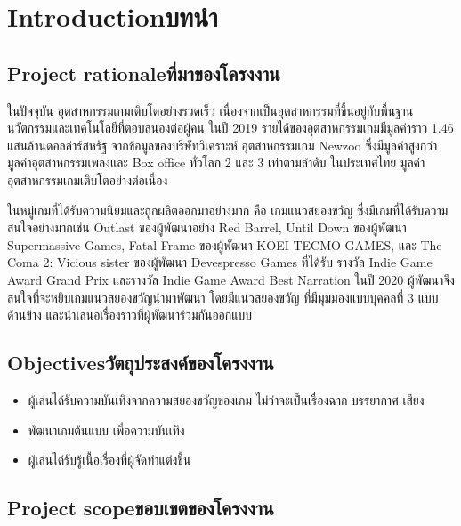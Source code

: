\chapter{\ifenglish Introduction\else บทนำ\fi}

\section{\ifenglish Project rationale\else ที่มาของโครงงาน\fi}


ในปัจจุบัน อุตสาหกรรมเกมเติบโตอย่างรวดเร็ว เนื่องจากเป็นอุตสาหกรรมที่ขึ้นอยู่กับพื้นฐานนวัตกรรมและเทคโนโลยีที่ตอบสนองต่อผู้คน ในปี 2019 รายได้ของอุตสาหกรรมเกมมีมูลค่าราว 1.46 แสนล้านดอลล่าร์สหรัฐ จากข้อมูลของบริษัทวิเคราะห์
อุตสาหกรรมเกม Newzoo ซึ่งมีมูลค่าสูงกว่ามูลค่าอุตสาหกรรมเพลงและ Box office ทั่วโลก 2 และ 3 เท่าตามลำดับ ในประเทศไทย มูลค่าอุตสาหกรรมเกมเติบโตอย่างต่อเนื่อง 


ในหมู่เกมที่ได้รับความนิยมและถูกผลิตออกมาอย่างมาก คือ เกมแนวสยองขวัญ ซึ่งมีเกมที่ได้รับความสนใจอย่างมากเช่น Outlast ของผู้พัฒนาอย่าง Red Barrel, Until Down ของผู้พัฒนา Supermassive Games, 
Fatal Frame ของผู้พัฒนา KOEI TECMO GAMES, และ The Coma 2: Vicious sister ของผู้พัฒนา Devespresso Games ที่ได้รับ รางวัล Indie Game Award Grand Prix และรางวัล Indie Game Award Best Narration 
ในปี 2020 ผู้พัฒนาจึงสนใจที่จะหยิบเกมแนวสยองขวัญนำมาพัฒนา โดยมีแนวสยองขวัญ ที่มีมุมมองแบบบุคคลที่ 3 แบบด้านข้าง และนำเสนอเรื่องราวที่ผู้พัฒนาร่วมกันออกแบบ

\section{\ifenglish Objectives\else วัตถุประสงค์ของโครงงาน\fi}

\begin{itemize}
    \item ผู้เล่นได้รับความบันเทิงจากความสยองขวัญของเกม ไม่ว่าจะเป็นเรื่องฉาก บรรยากาศ เสียง
    \item พัฒนาเกมต้นแบบ เพื่อความบันเทิง
    \item ผู้เล่นได้รับรู้เนื้อเรื่องที่ผู้จัดทำแต่งขึ้น
\end{itemize}

\section{\ifenglish Project scope\else ขอบเขตของโครงงาน\fi}

